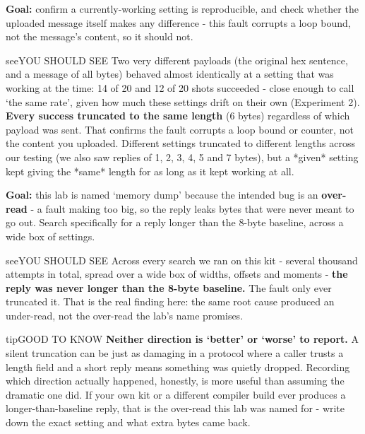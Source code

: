 \documentclass[11pt,letterpaper]{article}
\begin{document}

\textbf{Goal:} confirm a currently-working setting is reproducible, and check whether the uploaded message itself
makes any difference - this fault corrupts a loop bound, not the message's content, so it should not.

\begin{guidecallout}{see}{YOU SHOULD SEE}
Two very different payloads (the original hex sentence, and a message of all  bytes) behaved almost
identically at a setting that was working at the time: 14 of 20 and 12 of 20 shots succeeded - close enough to call
`the same rate', given how much these settings drift on their own (Experiment 2). \textbf{Every success truncated to
the same length} (6 bytes) regardless of which payload was sent. That confirms the fault corrupts a loop bound or
counter, not the content you uploaded. Different settings truncated to different lengths across our testing (we also
saw replies of 1, 2, 3, 4, 5 and 7 bytes), but a *given* setting kept giving the *same* length for as long as it kept
working at all.
\end{guidecallout}


\textbf{Goal:} this lab is named `memory dump' because the intended bug is an \textbf{over-read} - a fault making
 too big, so the reply leaks bytes that were never meant to go out. Search specifically for a reply
longer than the 8-byte baseline, across a wide box of settings.

\begin{guidecallout}{see}{YOU SHOULD SEE}
Across every search we ran on this kit - several thousand attempts in total, spread over a wide box of widths, offsets
and moments - \textbf{the reply was never longer than the 8-byte baseline.} The fault only ever truncated it. That is
the real finding here: the same root cause produced an under-read, not the over-read the lab's name promises.
\end{guidecallout}

\begin{guidecallout}{tip}{GOOD TO KNOW}
\textbf{Neither direction is `better' or `worse' to report.} A silent truncation can be just as damaging in a protocol
where a caller trusts a length field and a short reply means something was quietly dropped. Recording which direction
actually happened, honestly, is more useful than assuming the dramatic one did. If your own kit or a different
compiler build ever produces a longer-than-baseline reply, that is the over-read this lab was named for - write down
the exact setting and what extra bytes came back.
\end{guidecallout}
\end{document}
